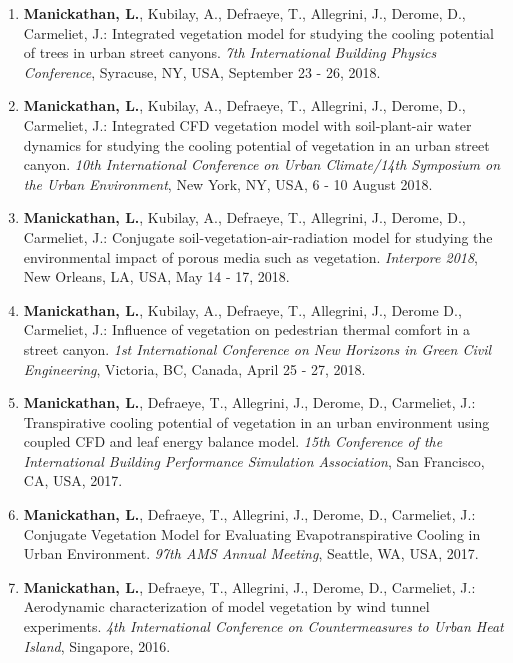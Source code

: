 \begin{enumerate}
	\item \textbf{Manickathan, L.}, Kubilay, A., Defraeye, T., Allegrini, J., Derome, D., Carmeliet, J.: Integrated vegetation model for studying the cooling potential of trees in urban street canyons. \textit{7th International Building Physics Conference}, Syracuse, NY, USA, September 23 - 26, 2018.
	
	\item \textbf{Manickathan, L.}, Kubilay, A., Defraeye, T., Allegrini, J., Derome, D., Carmeliet, J.: Integrated CFD vegetation model with soil-plant-air water dynamics for studying the cooling potential of vegetation in an urban street canyon. \textit{10th International Conference on Urban Climate/14th Symposium on the Urban Environment}, New York, NY, USA, 6 - 10 August 2018.
	
	\item \textbf{Manickathan, L.}, Kubilay, A., Defraeye, T., Allegrini, J., Derome, D., Carmeliet, J.: Conjugate soil-vegetation-air-radiation model for studying the environmental impact of porous media such as vegetation. \textit{Interpore 2018}, New Orleans, LA, USA, May 14 - 17, 2018.
	
	\item \textbf{Manickathan, L.}, Kubilay, A., Defraeye, T., Allegrini, J., Derome D., Carmeliet, J.: Influence of vegetation on pedestrian thermal comfort in a street canyon. \textit{1st International Conference on New Horizons in Green Civil Engineering}, Victoria, BC, Canada, April 25 - 27, 2018.
	
	\item \textbf{Manickathan, L.}, Defraeye, T., Allegrini, J., Derome, D., Carmeliet, J.: Transpirative cooling potential of vegetation in an urban environment using coupled CFD and leaf energy balance model. \textit{15th Conference of the International Building Performance Simulation Association}, San Francisco, CA, USA, 2017.
	
	\item \textbf{Manickathan, L.}, Defraeye, T., Allegrini, J., Derome, D., Carmeliet, J.: Conjugate Vegetation Model for Evaluating Evapotranspirative Cooling in Urban Environment. \textit{97th AMS Annual Meeting}, Seattle, WA, USA, 2017.
	
	\item \textbf{Manickathan, L.}, Defraeye, T., Allegrini, J., Derome, D., Carmeliet, J.: Aerodynamic characterization of model vegetation by wind tunnel experiments. \textit{4th International Conference on Countermeasures to Urban Heat Island}, Singapore, 2016.
\end{enumerate}

